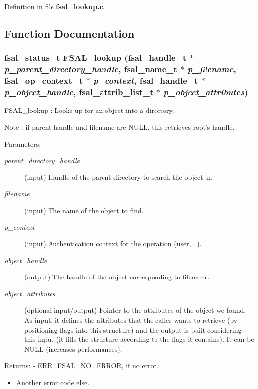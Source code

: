 Definition in file {\bf fsal\_\-lookup.c}.

\subsection{Function Documentation}
\subsubsection[{FSAL\_\-lookup}]{\setlength{\rightskip}{0pt plus 5cm}fsal\_\-status\_\-t FSAL\_\-lookup (fsal\_\-handle\_\-t $\ast$ {\em p\_\-parent\_\-directory\_\-handle}, \/  fsal\_\-name\_\-t $\ast$ {\em p\_\-filename}, \/  fsal\_\-op\_\-context\_\-t $\ast$ {\em p\_\-context}, \/  fsal\_\-handle\_\-t $\ast$ {\em p\_\-object\_\-handle}, \/  fsal\_\-attrib\_\-list\_\-t $\ast$ {\em p\_\-object\_\-attributes})}\label{fsal__lookup_8c_d1b5034a8869cafa3af9173bd39bbadb}


FSAL\_\-lookup : Looks up for an object into a directory.

Note : if parent handle and filename are NULL, this retrieves root's handle.

\begin{Desc}
\item[Parameters:]
\begin{description}
\item[{\em parent\_\-directory\_\-handle}](input) Handle of the parent directory to search the object in. \item[{\em filename}](input) The name of the object to find. \item[{\em p\_\-context}](input) Authentication context for the operation (user,...). \item[{\em object\_\-handle}](output) The handle of the object corresponding to filename. \item[{\em object\_\-attributes}](optional input/output) Pointer to the attributes of the object we found. As input, it defines the attributes that the caller wants to retrieve (by positioning flags into this structure) and the output is built considering this input (it fills the structure according to the flags it contains). It can be NULL (increases performances).\end{description}
\end{Desc}
\begin{Desc}
\item[Returns:]- ERR\_\-FSAL\_\-NO\_\-ERROR, if no error.\begin{itemize}
\item Another error code else. \end{itemize}
\end{Desc}


